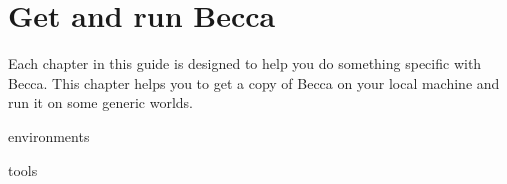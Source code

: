 \chapter{Get and run Becca}

Each chapter in this guide is designed to help you do something specific with Becca. This chapter helps you to get a copy of Becca on your local machine and run it on some generic worlds.

environments 

tools